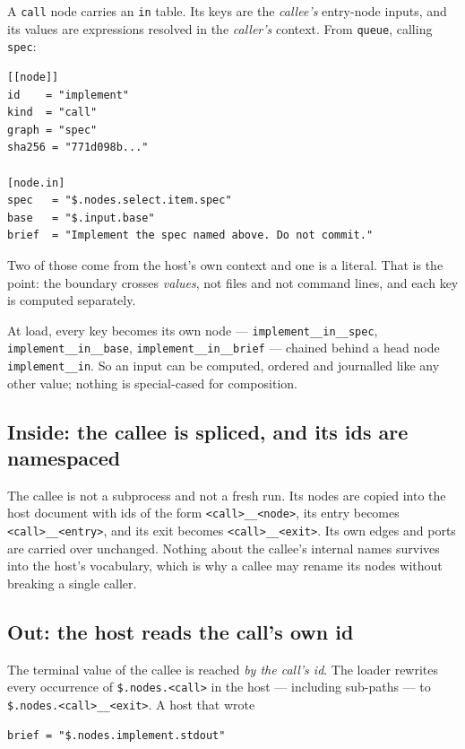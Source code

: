 A \texttt{call} node carries an \texttt{in} table. Its keys are the \emph{callee's} entry-node inputs,
and its values are expressions resolved in the \emph{caller's} context. From \texttt{queue}, calling
\texttt{spec}:

\begin{verbatim}
[[node]]
id    = "implement"
kind  = "call"
graph = "spec"
sha256 = "771d098b..."

[node.in]
spec   = "$.nodes.select.item.spec"
base   = "$.input.base"
brief  = "Implement the spec named above. Do not commit."
\end{verbatim}

Two of those come from the host's own context and one is a literal. That is the point: the boundary
crosses \emph{values}, not files and not command lines, and each key is computed separately.

At load, every key becomes its own node --- \texttt{implement\_\_in\_\_spec},
\texttt{implement\_\_in\_\_base}, \texttt{implement\_\_in\_\_brief} --- chained behind a head node
\texttt{implement\_\_in}. So an input can be computed, ordered and journalled like any other value;
nothing is special-cased for composition.

\subsection{Inside: the callee is spliced, and its ids are namespaced}

The callee is not a subprocess and not a fresh run. Its nodes are copied into the host document with
ids of the form \texttt{<call>\_\_<node>}, its entry becomes \texttt{<call>\_\_<entry>}, and its exit
becomes \texttt{<call>\_\_<exit>}. Its own edges and ports are carried over unchanged. Nothing about
the callee's internal names survives into the host's vocabulary, which is why a callee may rename its
nodes without breaking a single caller.

\subsection{Out: the host reads the call's own id}

The terminal value of the callee is reached \emph{by the call's id}. The loader rewrites every
occurrence of \texttt{\$.nodes.<call>} in the host --- including sub-paths --- to
\texttt{\$.nodes.<call>\_\_<exit>}. A host that wrote

\begin{verbatim}
brief = "$.nodes.implement.stdout"
\end{verbatim}

